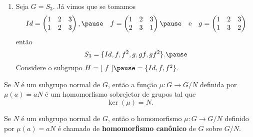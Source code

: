 \documentclass{beamer}
\begin{document}
    \begin{frame}
        \begin{exemplos}
            \begin{enumerate}[label=({\arabic*})]
                \conti
                
                \item Seja $G = S_3$. \pause J\'a vimos que se tomamos
                \[
                    Id = \begin{pmatrix}
                        1 & 2 & 3\\
                        1 & 2 & 3
                    \end{pmatrix}, \pause\quad
                    f = \begin{pmatrix}
                        1 & 2 & 3\\
                        2 & 3 & 1
                    \end{pmatrix} \pause \quad \mbox{e}\quad
                    g = \begin{pmatrix}
                        1 & 2 & 3\\
                        1 & 3 & 2
                    \end{pmatrix}
                \]
                ent\~ao
                \[
                    S_3 = \{Id, f, f^2, g, gf, gf^2\}. \pause
                \]
                Considere o subgrupo $H = [\ f\ ] \pause = \{Id, f, f^2\}$.

                \seti
            \end{enumerate}
        \end{exemplos}
    \end{frame}

    \begin{frame}
        \begin{proposicao}
            Se $N$ \'e um subgrupo normal de $G$, \pause ent\~ao a fun\c{c}\~ao $\mu : G \to G/N$ \pause definida por $\mu(a) = aN$ \pause \'e um homomorfismo sobrejetor \pause de grupos tal que \pause
            \[
                \ker(\mu) = N.
            \]
        \end{proposicao}
    \end{frame}

    \begin{frame}
        \begin{definicao}
            Se $N$ \'e um subgrupo normal de $G$, \pause ent\~ao o homomorfismo $\mu : G \to G/N$ \pause definido por $\mu(a) = aN$ \pause \'e chamado de \textbf{homomorfismo can\^onico} \pause de $G$ sobre $G/N$.
        \end{definicao}
    \end{frame}
\end{document}

